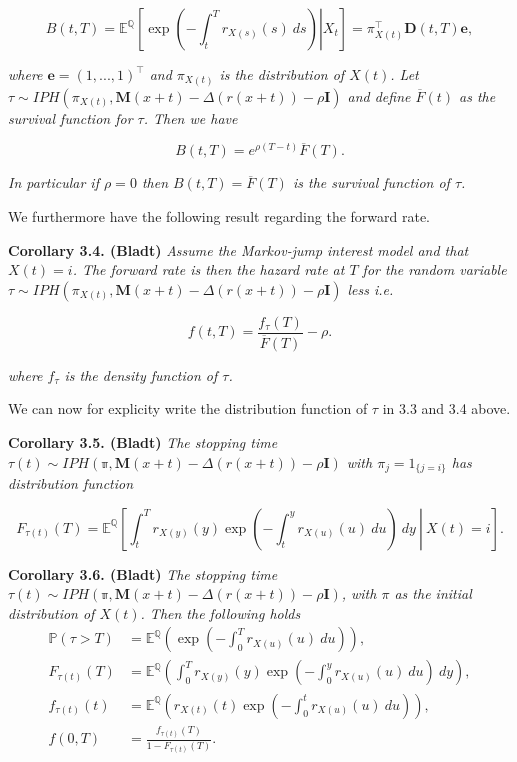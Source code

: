 \documentclass[
]{book}
\begin{document}
\[
B(t,T)=\mathbb E^{\mathbb Q}\left[\left.\exp\left(-\int_t^Tr_{X(s)}(s)\ ds\right) \right\vert X_t\right]=\pi_{X(t)}^\top\mathbf D(t,T)\mathbf e,
\]

\emph{where \(\mathbf e=(1,...,1)^\top\) and \(\pi_{X(t)}\) is the distribution of \(X(t)\). Let \(\tau\sim IPH(\pi_{X(t)},\mathbf M(x+t)-\Delta (r(x+t))-\rho \mathbf I)\) and define \(\overline F(t)\) as the survival function for \(\tau\). Then we have}

\[
B(t,T)=e^{\rho (T-t)}\overline F(T).
\]

\emph{In particular if \(\rho = 0\) then \(B(t,T)=\overline F(T)\) is the survival function of \(\tau\).}

We furthermore have the following result regarding the forward rate.

\textbf{Corollary 3.4. (Bladt)} \emph{Assume the Markov-jump interest model and that \(X(t)=i\). The forward rate is then the hazard rate at \(T\) for the random variable \(\tau\sim IPH(\pi_{X(t)},\mathbf M(x+t)-\Delta (r(x+t))-\rho \mathbf I)\) less \rho i.e.}

\[
f(t,T)=\frac{f_{\tau}(T)}{\overline F(T)}-\rho.
\]

\emph{where \(f_\tau\) is the density function of \(\tau\).}

We can now for explicity write the distribution function of \(\tau\) in 3.3 and 3.4 above.

\textbf{Corollary 3.5. (Bladt)} \emph{The stopping time \(\tau(t)\sim IPH(\mathbb \pi,\mathbf M(x+t)-\Delta (r(x+t))-\rho \mathbf I)\) with \(\pi_j=1_{\{j=i\}}\) has distribution function}

\[
F_{\tau(t)}(T)=\mathbb E^{\mathbb Q}\left[\left.\int_t^T r_{X(y)}(y)\exp\left(-\int_t^yr_{X(u)}(u)\ du\right)\ dy\ \right\vert\ X(t)=i\right].
\]

\textbf{Corollary 3.6. (Bladt)} \emph{The stopping time \(\tau(t)\sim IPH(\mathbb \pi,\mathbf M(x+t)-\Delta (r(x+t))-\rho \mathbf I)\), with \(\pi\) as the initial distribution of \(X(t)\). Then the following holds}
\begin{align*}
\mathbb P(\tau > T)&=\mathbb E^{\mathbb Q}\left(\exp\left(-\int_0^T r_{X(u)}(u)\ du\right)\right),\\
F_{\tau(t)}(T)&=\mathbb E^{\mathbb Q}\left(\int_0^T r_{X(y)}(y)\exp\left(-\int_0^y r_{X(u)}(u)\ du\right)\ dy\right),\\
f_{\tau(t)}(t)&=\mathbb E^{\mathbb Q}\left( r_{X(t)}(t)\exp\left(-\int_0^t r_{X(u)}(u)\ du\right)\right),\\
f(0,T)&=\frac{f_{\tau(t)}(T)}{1-F_{\tau(t)}(T)}.
\end{align*}
\end{document}

